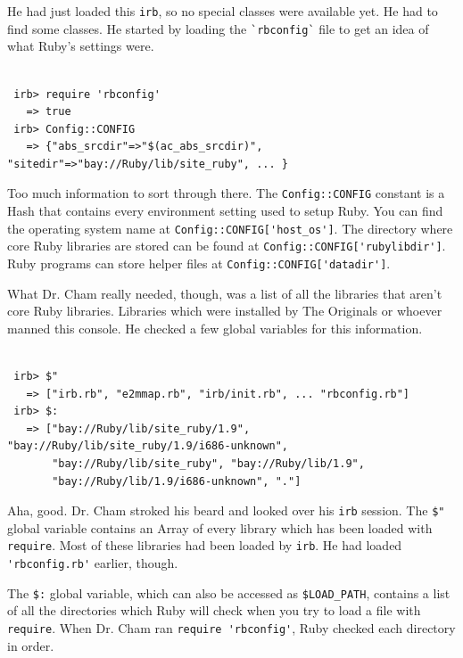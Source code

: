 \documentclass[10pt,twoside]{report}
\begin{document}
He had just loaded this \lstinline[breaklines=true]|irb|, so no
special classes were available yet.  He had to find some classes. He
started by loading the \lstinline[breaklines=true]|`rbconfig`| file to
get an idea of what Ruby's settings were.


\begin{lstlisting}

 irb> require 'rbconfig'
   => true
 irb> Config::CONFIG
   => {"abs_srcdir"=>"$(ac_abs_srcdir)", "sitedir"=>"bay://Ruby/lib/site_ruby", ... }

\end{lstlisting}


Too much information to sort through there.  The
\lstinline[breaklines=true]|Config::CONFIG| constant is a Hash that
contains every environment setting used to setup Ruby.  You can find
the operating system name at
\lstinline[breaklines=true]|Config::CONFIG['host_os']|.  The directory
where core Ruby libraries are stored can be found at
\lstinline[breaklines=true]|Config::CONFIG['rubylibdir']|.  Ruby
programs can store helper files at
\lstinline[breaklines=true]|Config::CONFIG['datadir']|.

What Dr. Cham really needed, though, was a list of all the libraries
that aren't core Ruby libraries.  Libraries which were installed by
The Originals or whoever manned this console. He checked a few global
variables for this information.


\begin{lstlisting}

 irb> $"
   => ["irb.rb", "e2mmap.rb", "irb/init.rb", ... "rbconfig.rb"]
 irb> $:
   => ["bay://Ruby/lib/site_ruby/1.9", "bay://Ruby/lib/site_ruby/1.9/i686-unknown",
       "bay://Ruby/lib/site_ruby", "bay://Ruby/lib/1.9",
       "bay://Ruby/lib/1.9/i686-unknown", "."]

\end{lstlisting}


Aha, good.  Dr. Cham stroked his beard and looked over his
\lstinline[breaklines=true]|irb| session.  The
\lstinline[breaklines=true]|$"| global variable contains an Array of
every library which has been loaded with
\lstinline[breaklines=true]|require|.  Most of these libraries had
been loaded by \lstinline[breaklines=true]|irb|.  He had loaded
\lstinline[breaklines=true]|'rbconfig.rb'| earlier, though.

The \lstinline[breaklines=true]|$:| global variable, which can also be
accessed as \lstinline[breaklines=true]|$LOAD_PATH|, contains a list
of all the directories which Ruby will check when you try to load a
file with \lstinline[breaklines=true]|require|.  When Dr. Cham ran
\lstinline[breaklines=true]|require 'rbconfig'|, Ruby checked each
directory in order.
\end{document}
